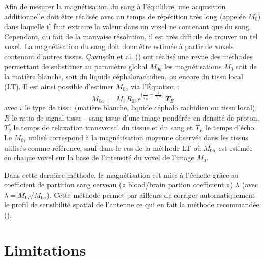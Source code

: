 Afin de mesurer la magnétisation du sang à l’équilibre, une acquisition additionnelle doit être
réalisée avec un temps de répétition très long (appelée $M_0$) dans laquelle il faut extraire la valeur dans
un voxel ne contenant que du sang. Cependant, du fait de la mauvaise résolution, il est très difficile de
trouver un tel voxel. La magnétisation du sang doit donc être estimée à partir de voxels contenant
d’autres tissus. Çavuşo\u{l}u et al. (\cite{Cavusoglu2009}) ont réalisé une revue des méthodes permettant de substituer au
paramètre global $M_{0a}$
les magnétisations $M_0$ soit de la matière blanche, soit du liquide
céphalorachidien, ou encore du tissu local (LT). Il est ainsi possible d’estimer $M_{0a}$ via l’Équation :
\begin{equation}
M_{0a}\,=\,M_i\,R_{0i}\,e^{\bigl(\frac{1}{T_{2i}^{\ast}}-\frac{1}{T_2\ast}\bigr)}\,T_E
\end{equation}
avec $i$ le type de tissu (matière blanche, liquide céphalo rachidien ou tissu local), $R$ le ratio de signal
tissu – sang issue d’une image pondérée en densité de proton, $T_2^{\ast}$ le temps de relaxation transversal
du tissue et du sang et $T_E$ le temps d’écho. Le $M_{0i}$ utilisé correspond à la magnétisation moyenne
observée dans les tissus utilisés comme référence, sauf dans le cas de la méthode LT où $M_{0a}$ est
estimée en chaque voxel sur la base de l’intensité du voxel de l’image $M_0$.

Dans cette dernière méthode, la magnétisation est mise à l’échelle grâce au coefficient de
partition sang cerveau (« blood/brain partion coefficient ») $\lambda$ (avec $\lambda = M_{0T}/M_{0a}$). Cette méthode
permet par ailleurs de corriger automatiquement le profil de sensibilité spatial de l’antenne ce qui en
fait la méthode recommandée (\cite{Cavusoglu2009}).
\section{Limitations}
